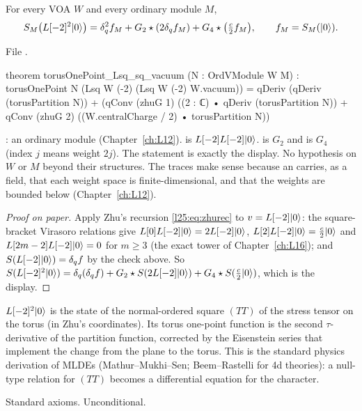 \begin{theorem}\label{l25:thm:tower}
For every VOA $W$ and every ordinary module $M$,
\begin{equation*}
S_M\big(L[-2]^2|0\rangle\big)=\delta_q^2f_M+G_2\star(2\delta_q f_M)+G_4\star\big(\tfrac c2f_M\big),
\qquad f_M=S_M(|0\rangle).
\end{equation*}
\end{theorem}
\noindent File .
\begin{leancode}
theorem torusOnePoint_Lsq_sq_vacuum (N : OrdVModule W M) :
    torusOnePoint N (Lsq W (-2) (Lsq W (-2) W.vacuum))
      = qDeriv (qDeriv (torusPartition N))
        + (qConv (zhuG 1) ((2 : ℂ) • qDeriv (torusPartition N))
          + qConv (zhuG 2) ((W.centralCharge / 2) • torusPartition N))
\end{leancode}
\begin{dictionary}
: an ordinary module (Chapter~\ref{ch:L12}).  is
$L[-2]L[-2]|0\rangle$.  is $G_2$ and  is $G_4$ (index $j$ means weight $2j$). The
statement is exactly the display. No hypothesis on $W$ or $M$ beyond their structures. The traces make sense
because an  carries, as a field, that each weight space is finite-dimensional, and that the weights are
bounded below (Chapter~\ref{ch:L12}).
\end{dictionary}
\begin{proof}[Proof on paper]
Apply Zhu's recursion \eqref{l25:eq:zhurec} to
$v=L[-2]|0\rangle$: the square-bracket Virasoro relations give $L[0]L[-2]|0\rangle=2L[-2]|0\rangle$,
$L[2]L[-2]|0\rangle=\frac c2|0\rangle$ and $L[2m-2]L[-2]|0\rangle=0$ for $m\ge3$ (the exact tower
 of Chapter~\ref{ch:L16}); and $S(L[-2]|0\rangle)=\delta_q f$ by the check above. So
$S(L[-2]^2|0\rangle)=\delta_q(\delta_q f)+G_2\star S(2L[-2]|0\rangle)+G_4\star S(\frac c2|0\rangle)$,
which is the display.
\end{proof}
\begin{physics}
$L[-2]^2|0\rangle$ is the state of the normal-ordered square $(TT)$ of the stress tensor on the
torus (in Zhu's coordinates). Its torus one-point function is the second $\tau$-derivative of the partition
function, corrected by the Eisenstein series that implement the change from the plane to the torus. This is the
standard physics derivation of MLDEs (Mathur--Mukhi--Sen; Beem--Rastelli for 4d theories): a null-type relation for
$(TT)$ becomes a differential equation for the character.
\end{physics}
\begin{status}
Standard axioms. Unconditional.
\end{status}

